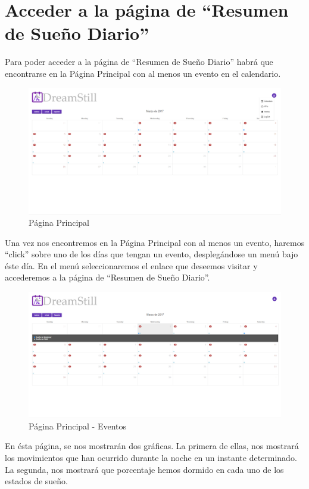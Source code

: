 \documentclass[11pt,openany]{book}
\begin{document}
\section{Acceder a la página de ``Resumen de Sueño Diario''}

Para poder acceder a la página de ``Resumen de Sueño Diario'' habrá que encontrarse en la Página Principal con al menos un evento en el calendario.

\begin{figure}[H]
\centering
\includegraphics[totalheight=6cm]{manualUsuario/paginaPrincipal.png}
\caption{Página Principal}
\end{figure}

Una vez nos encontremos en la Página Principal con al menos un evento, haremos ``click'' sobre uno de los días que tengan un evento, desplegándose un menú bajo éste día. En el menú seleccionaremos el enlace que deseemos visitar y accederemos a la página de ``Resumen de Sueño Diario''.

\begin{figure}[H]
\centering
\includegraphics[totalheight=6cm]{manualUsuario/eventos.png}
\caption{Página Principal - Eventos}
\end{figure}

En ésta página, se nos mostrarán dos gráficas. La primera de ellas, nos mostrará los movimientos que han ocurrido durante la noche en un instante determinado. La segunda, nos mostrará que porcentaje hemos dormido en cada uno de los estados de sueño.
\end{document}
